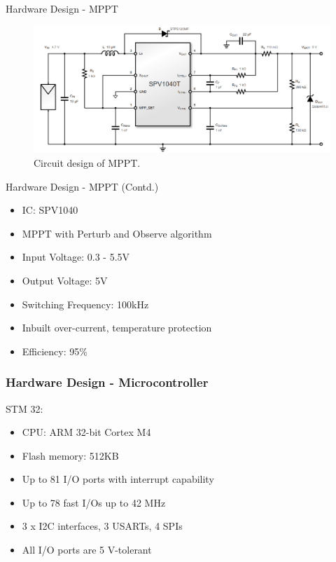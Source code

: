 \documentclass[aspectratio=169]{beamer}
\begin{document}
	
	\begin{frame}{Hardware Design - MPPT }
		\begin{figure}[h]
			\centering
			\includegraphics[width=1\textwidth]{diag/MPPT.png}
			\caption{Circuit design of MPPT.}
			\label{fig:mesh1}
		\end{figure}
	\end{frame}

	\begin{frame}{Hardware Design - MPPT (Contd.)}
	\begin{itemize}
	\item IC: SPV1040
	\item MPPT with Perturb and Observe algorithm	
	\item Input Voltage: 0.3 - 5.5V
	\item Output Voltage: 5V
	\item Switching Frequency: 100kHz
	\item Inbuilt over-current, temperature protection
	\item Efficiency: 95\%
\end{itemize}
\end{frame}

    \begin{frame}
    \frametitle{Hardware Design - Microcontroller}
    
       STM 32:
      \begin{itemize}
        
        \item CPU: ARM 32-bit Cortex M4 
        \item Flash memory: 512KB
        \item Up to 81 I/O ports with interrupt capability
        \item Up to 78 fast I/Os up to 42 MHz
        \item 3 x I2C interfaces, 3 USARTs, 4 SPIs
        \item All I/O ports are 5 V-tolerant
      \end{itemize}
    \end{frame}
    
\end{document}
